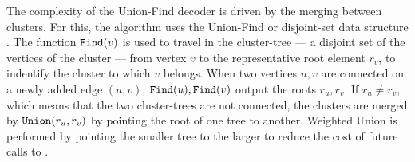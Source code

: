 The complexity of the Union-Find decoder is driven by the merging between clusters. For this, the algorithm uses the Union-Find or disjoint-set data structure \cite{tarjan1975efficiency}. The function $\texttt{Find}(v)$ is used to travel in the cluster-tree --- a disjoint set of the vertices of the cluster --- from vertex $v$ to the representative root element $r_v$, to indentify the cluster to which $v$ belongs. When two vertices $u, v$ are connected on a newly added edge $(u,v)$, $\texttt{Find}(u), \texttt{Find}(v)$ output the roots $r_u, r_v$. If $r_u \neq r_v$, which means that the two cluster-trees are not connected, the clusters are merged by $\texttt{Union}(r_u, r_v)$ by pointing the root of one tree to another. Weighted Union is performed by pointing the smaller tree to the larger to reduce the cost of future calls to .